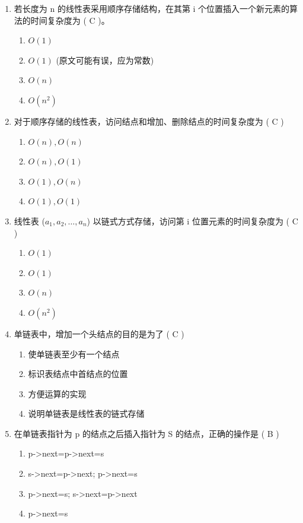 \documentclass[12pt, a4paper]{article}
\begin{document}
\begin{enumerate}[label=\arabic*.]
    \item 若长度为 n 的线性表采用顺序存储结构，在其第 i 个位置插入一个新元素的算法的时间复杂度为 ( C )。
    \begin{enumerate}
        \item $O(1)$
        \item $O(1)$ (原文可能有误，应为常数)
        \item $O(n)$
        \item $O(n^2)$
    \end{enumerate}

    \item 对于顺序存储的线性表，访问结点和增加、删除结点的时间复杂度为 ( C )
    \begin{enumerate}
        \item $O(n), O(n)$
        \item $O(n), O(1)$
        \item $O(1), O(n)$
        \item $O(1), O(1)$
    \end{enumerate}

    \item 线性表 ($a_1, a_2, \dots, a_n$) 以链式方式存储，访问第 i 位置元素的时间复杂度为 ( C )
    \begin{enumerate}
        \item $O(1)$
        \item $O(1)$
        \item $O(n)$
        \item $O(n^2)$
    \end{enumerate}

    \item 单链表中，增加一个头结点的目的是为了 ( C )
    \begin{enumerate}
        \item 使单链表至少有一个结点
        \item 标识表结点中首结点的位置
        \item 方便运算的实现
        \item 说明单链表是线性表的链式存储
    \end{enumerate}

    \item 在单链表指针为 p 的结点之后插入指针为 S 的结点，正确的操作是 ( B )
    \begin{enumerate}
        \item p->next=p->next=s
        \item s->next=p->next; p->next=s
        \item p->next=s; s->next=p->next
        \item p->next=s
    \end{enumerate}


\end{enumerate}
\end{document}
